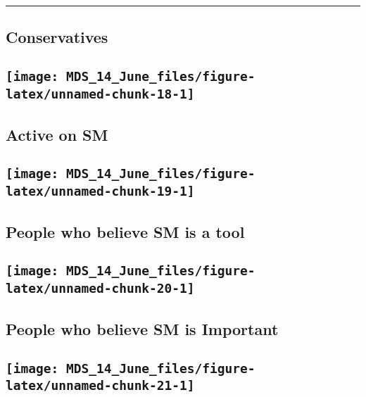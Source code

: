 \documentclass[
]{article}
\begin{document}
\begin{center}\rule{0.5\linewidth}{0.5pt}\end{center}

\hypertarget{conservatives}{%
\subsection{Conservatives}\label{conservatives}}

\hypertarget{section-4}{%
\subsection{\texorpdfstring{\texttt{[image: MDS\_14\_June\_files/figure-latex/unnamed-chunk-18-1]}}{}}\label{section-4}}

\hypertarget{active-on-sm}{%
\subsection{Active on SM}\label{active-on-sm}}

\hypertarget{section-5}{%
\subsection{\texorpdfstring{\texttt{[image: MDS\_14\_June\_files/figure-latex/unnamed-chunk-19-1]}}{}}\label{section-5}}

\hypertarget{people-who-believe-sm-is-a-tool}{%
\subsection{People who believe SM is a
tool}\label{people-who-believe-sm-is-a-tool}}

\hypertarget{section-6}{%
\subsection{\texorpdfstring{\texttt{[image: MDS\_14\_June\_files/figure-latex/unnamed-chunk-20-1]}}{}}\label{section-6}}

\hypertarget{people-who-believe-sm-is-important}{%
\subsection{People who believe SM is
Important}\label{people-who-believe-sm-is-important}}

\hypertarget{section-7}{%
\subsection{\texorpdfstring{\texttt{[image: MDS\_14\_June\_files/figure-latex/unnamed-chunk-21-1]}}{}}\label{section-7}}
\end{document}
